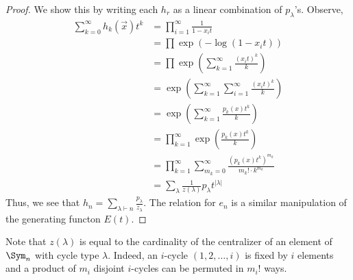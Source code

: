 \documentclass[11pt,leqno,oneside]{amsart}
\numberwithin{thm}{section}
\newcommand{\partitionof}{\vdash}
\begin{document}
\begin{proof}
  We show this by writing each \(h_r\) as a linear combination of
  \(p_\lambda\)'s. Observe, 
  \begin{align*}
        \sum_{k=0}^\infty h_k(\vec{x}) t^k
        & = \prod_{i=1}^\infty \frac{1}{1-x_i t} \\
        & = \prod \exp\left({-\log(1-x_i t)}\right)\\
        & = \prod \exp\left({\sum_{k=1}^\infty \frac{(x_i
          t)^k}{k}}\right) \\ 
        & = \exp\left({\sum_{k=1}^\infty \sum_{i=1}^\infty \frac{(x_i
          t)^k}{k}}\right) \\
        & = \exp\left( \sum_{k=1}^\infty \frac{p_k(x)t^k}{k} \right)
        \\
        & = \prod_{k=1}^\infty \exp\left( \frac{p_k(x)t^k}{k} \right)
        \\
        & = \prod_{k=1}^\infty \sum_{m_k = 0}^\infty
          \frac{(p_k(x)t^k)^{m_k}}{m_k! \cdot k^{m_k}} \\
        & = \sum_{\lambda} \frac{1}{z(\lambda)}p_\lambda t^{|\lambda|}
      \end{align*}
      Thus, we see that \(h_n = \sum_{\lambda \partitionof n}
      \frac{p_\lambda}{z_\lambda}\). The relation for \(e_n\) is a
      similar manipulation of the generating functon \(E(t)\).
    \end{proof}
    \begin{rmk}
      Note that \(z(\lambda)\) is equal to the cardinality of the
      centralizer of an element of \(\Sym_n\) with cycle type
      \(\lambda\). Indeed, an \(i\)-cycle \((1,2,\ldots,i)\) is fixed
      by \(i\) elements and a product of \(m_i\) disjoint \(i\)-cycles
      can be permuted in \(m_i!\) ways. 
    \end{rmk}
\end{document}
